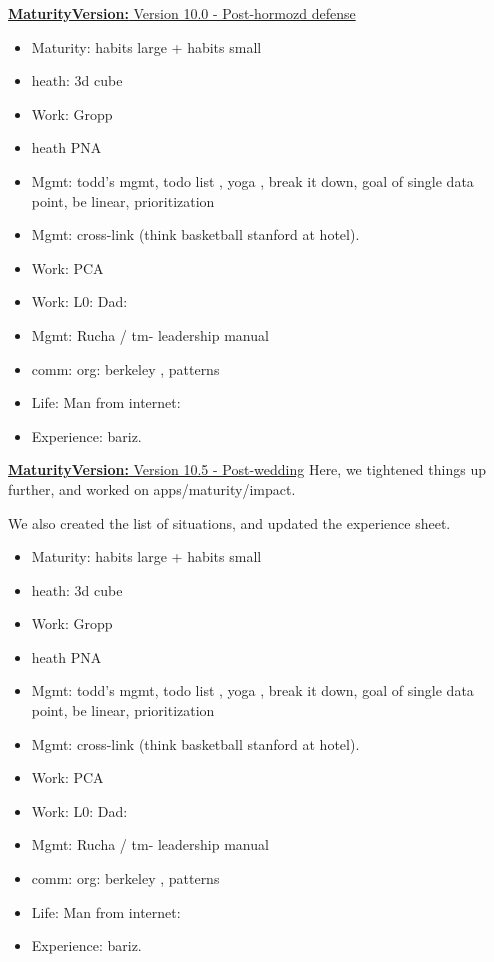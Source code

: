 \documentclass[11pt]{article}
\newcommand{\newMaturityVersion}[1]{\underline{\textbf{MaturityVersion:} #1} }
\begin{document}

\newMaturityVersion{Version 10.0 - Post-hormozd defense}
\begin{itemize} 
\item Maturity: habits large + habits small
\item heath: 3d cube 


\item Work: Gropp

\item heath PNA
\item Mgmt: todd's mgmt, todo list , yoga , break it down, goal of single data point, be linear, prioritization 
\item Mgmt: cross-link (think basketball stanford at hotel). 

\item Work: PCA
\item Work: L0: Dad: 

\item Mgmt: Rucha / tm- leadership manual 

\item comm: org: berkeley , patterns 
\item Life: Man from internet: 
\item Experience: bariz. 
\end{itemize}




\newMaturityVersion{Version 10.5 - Post-wedding}
Here, we tightened things up further, and worked on apps/maturity/impact. 

We also created the list of situations, and updated the experience sheet. 

\begin{itemize} 
\item Maturity: habits large + habits small
\item heath: 3d cube 

\item Work: Gropp 
\item heath PNA 
\item Mgmt: todd's mgmt, todo list , yoga , break it down, goal of single data point, be linear, prioritization 
\item Mgmt: cross-link (think basketball stanford at hotel). 

\item Work: PCA
\item Work: L0: Dad: 

\item Mgmt: Rucha / tm- leadership manual 

\item comm: org: berkeley , patterns 
\item Life: Man from internet: 
\item Experience: bariz. 
\end{itemize}
\end{document}
